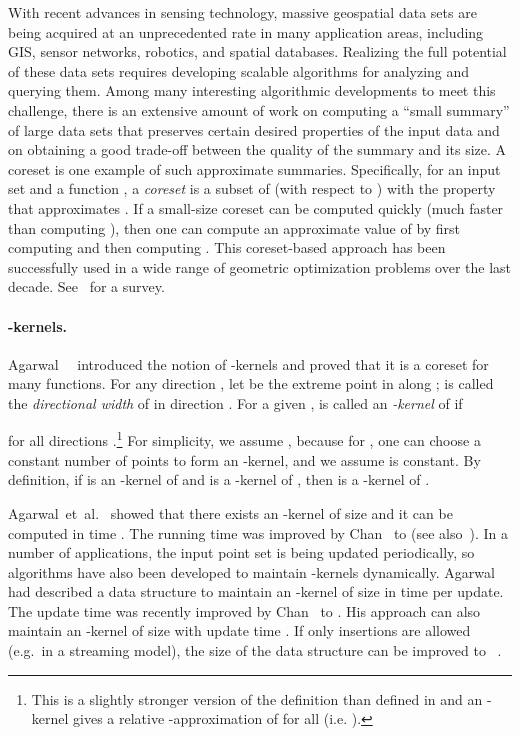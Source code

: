 \documentclass[11pt]{myclass}
\begin{document}
With recent advances in sensing technology, massive geospatial
data sets are being acquired at an unprecedented rate in many application
areas, including GIS, sensor networks, robotics, and spatial databases. Realizing the full potential of these data 
sets requires developing scalable algorithms for 
analyzing and querying them.  Among many interesting
algorithmic developments to meet this challenge,  there is an
extensive amount of work on computing a ``small summary'' of large 
data sets that preserves certain desired properties of the input data 
and on obtaining a good trade-off between the quality of the summary
and its size.  A coreset is one example of such approximate summaries.
Specifically, for an input set  and a function , 
a \emph{coreset}  is a subset of  (with respect to )
with the property that  approximates . If a small-size coreset
 can be computed quickly (much faster than computing ), then 
one can compute an approximate value of  by first
computing  and then computing . This 
coreset-based approach has been successfully used in a wide range of 
geometric optimization problems over the last decade.  See~\cite{AHV07} for a survey.



\paragraph{-kernels.} Agarwal~\etal~\cite{AHV04} introduced the notion
of -kernels and proved that it is a coreset for many functions.
For any direction , let 
 be the extreme point in  
along ;   is called 
the \emph{directional width} of  in direction .  
For a given ,  is called 
an \emph{-kernel} of  if 

for all directions .\footnote{This is a slightly stronger version of the definition than defined in 
\cite{AHV04} and an -kernel  gives a relative -approximation of  for all  (i.e. ).}
For simplicity, we assume , because for , 
one can choose a constant number of points to form an -kernel, and we assume  is constant.  
By definition, if  is an -kernel of  and  is a -kernel
of , then  is a -kernel of . 



Agarwal~{et~al.}~\cite{AHV04} showed that there exists
an -kernel of size  and it can be
computed in time . The running time was improved 
by Chan~\cite{Cha06} to  (see
also~\cite{YAPV04}).
In a number of applications, the input point set is being updated
periodically, so algorithms have also been developed to
maintain -kernels dynamically.
Agarwal~\etal~\cite{AHV04} had described a data structure to maintain
 an -kernel of size  
in  time per update.
The update time was recently improved by Chan~\cite{Cha08} to
. His approach can 
also maintain an -kernel of size  with 
update time .  If only insertions are allowed (e.g.\ in a streaming model),
the size of the data structure can be improved to 
~\cite{AY07,ZZ08}.
\end{document}
